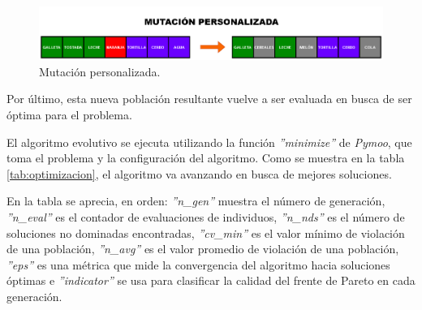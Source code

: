 \begin{figure}[H]
    \centering
    \includegraphics[width=1\textwidth]{figures/mutacion-custom.png}
    \caption{Mutación personalizada.}
    \label{fig:mutacion-custom}
\end{figure}

Por último, esta nueva población resultante vuelve a ser evaluada en busca de ser óptima para el problema.

El algoritmo evolutivo se ejecuta utilizando la función \textit{''minimize''} de \textit{Pymoo}, que toma el problema y la configuración del algoritmo. Como se muestra en la tabla \ref{tab:optimizacion}, el algoritmo va avanzando en busca de mejores soluciones.

En la tabla se aprecia, en orden: \textit{''n\_gen''} muestra el número de generación, \textit{''n\_eval''} es el contador de evaluaciones de individuos, \textit{''n\_nds''} es el número de soluciones no dominadas encontradas, \textit{''cv\_min''} es el valor mínimo de violación de una población, \textit{''n\_avg''} es el valor promedio de violación de una población, \textit{''eps''} es una métrica que mide la convergencia del algoritmo hacia soluciones óptimas e \textit{''indicator''} se usa para clasificar la calidad del frente de Pareto en cada generación.

